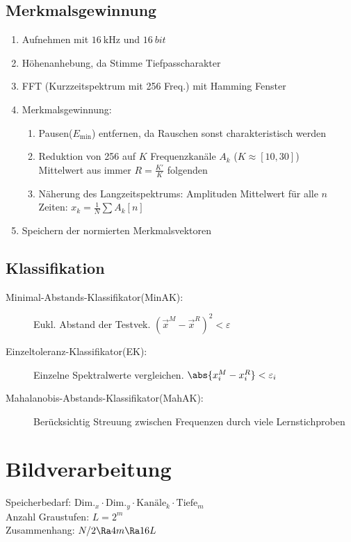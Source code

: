 \documentclass[fs, footer]{latex4ei}
\begin{document}
\begin{multicols*}{4}
	\subsection{Merkmalsgewinnung}
	\begin{enumerate}
		\item Aufnehmen mit $\SI{16}{\kilo \hertz}$ und $\SI{16}{bit}$
		\item Höhenanhebung, da Stimme Tiefpasscharakter
		\item FFT (Kurzzeitspektrum mit 256 Freq.) mit Hamming Fenster
		\item Merkmalsgewinnung: 
			\begin{enumerate}
				\item Pausen($E_{\min}$) entfernen, da Rauschen sonst charakteristisch werden
				\item Reduktion von 256 auf $K$ Frequenzkanäle $A_k$ ($K \approx [10,30]$)\\
					Mittelwert aus immer $R = \frac{K'}{K}$ folgenden
				\item Näherung des Langzeitspektrums: Amplituden Mittelwert für alle $n$ Zeiten: $x_k = \frac{1}{N} \sum A_k[n]$
			\end{enumerate}
		\item Speichern der normierten Merkmalsvektoren
	\end{enumerate}

	\subsection{Klassifikation}
	\begin{description}
		\item[Minimal-Abstands-Klassifikator(MinAK):] Eukl. Abstand der Testvek. $(\vec x^M - \vec x^R)^2 < \varepsilon$\\
		\item[Einzeltoleranz-Klassifikator(EK):] Einzelne Spektralwerte vergleichen. $\abs{x_i^M - x_i^R} < \varepsilon_i$\\
		\item[Mahalanobis-Abstands-Klassifikator(MahAK):] Berücksichtig Streuung zwischen Frequenzen durch viele Lernstichproben
	\end{description}





\section{Bildverarbeitung}
Speicherbedarf: $\text{Dim.}_x \cdot \text{Dim.}_y \cdot \text{Kanäle}_k \cdot \text{Tiefe}_m$\\
Anzahl Graustufen: $L = 2^m$\\
Zusammenhang: $N/2 \Ra 4m \Ra 16L$



\end{multicols*}
\end{document}
